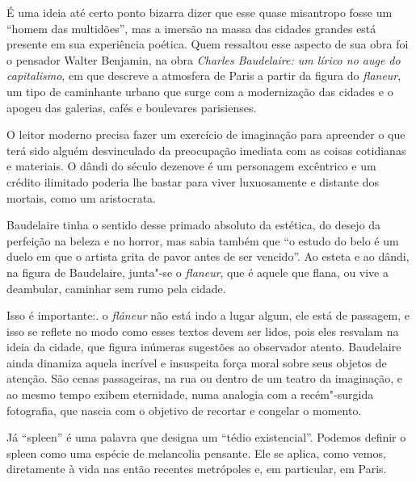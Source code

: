 \documentclass[12pt]{extarticle}
\begin{document}


É uma ideia até certo ponto bizarra dizer que esse quase misantropo
fosse um ``homem das multidões'', mas a imersão na massa das cidades
grandes está presente em sua experiência poética.
Quem ressaltou esse aspecto de sua obra foi o pensador Walter Benjamin,
na obra \textit{Charles Baudelaire: um lírico no auge do capitalismo}, em
que descreve a atmosfera de Paris a partir da figura do \textit{flaneur}, um
tipo de caminhante urbano que surge com a modernização das cidades e o
apogeu das galerias, cafés e boulevares parisienses.




O leitor moderno precisa fazer um exercício de imaginação para apreender
o que terá sido alguém desvinculado da preocupação imediata com as
coisas cotidianas e materiais.
O dândi do século dezenove é um personagem excêntrico e um crédito
ilimitado poderia lhe bastar para viver luxuosamente e distante dos
mortais, como um aristocrata.

Baudelaire tinha o sentido desse primado absoluto da estética, do
desejo da perfeição na beleza e no horror, mas sabia também que ``o
estudo do belo é um duelo em que o artista grita de pavor antes de ser
vencido''.
Ao esteta e ao dândi, na figura de Baudelaire, junta"-se o \textit{flaneur},
que é aquele que flana, ou vive a deambular, caminhar sem rumo pela
cidade.

Isso é importante:. o \textit{flâneur} não está indo a lugar algum, ele está de
passagem, e isso se reflete no modo como esses textos devem ser lidos,
pois eles resvalam na ideia da cidade, que figura inúmeras sugestões ao observador atento.
Baudelaire ainda dinamiza aquela incrível e insuspeita força moral sobre
seus objetos de atenção.
São cenas passageiras, na rua ou dentro de um teatro da imaginação, e
ao mesmo tempo exibem eternidade, numa analogia com a recém"-surgida
fotografia, que nascia com o objetivo de recortar e congelar o
momento.

Já ``spleen'' é uma palavra que designa um ``tédio existencial''.
Podemos definir o spleen como uma espécie de melancolia pensante.
Ele se aplica, como vemos, diretamente à vida nas então recentes
metrópoles e, em particular, em Paris.
\end{document}
